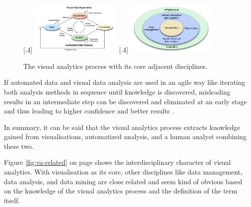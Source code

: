 \begin{figure}[!htb]
    \centering
  [.4\linewidth]
    {
        \includegraphics[width=0.4\textwidth,keepaspectratio]
        {images/va/va-process.png}
    }
    \qquad
    [.4\linewidth]
    {
        \includegraphics[width=0.4\textwidth,keepaspectratio]
        {images/va/va-related.png}
    }

    \caption{The visual analytics process with its core adjacent disciplines.}
\end{figure}

If automated data and visual data analysis are used in an agile way like iterating both analysis methods in sequence until knowledge is discovered, misleading results in an intermediate step can be discovered and eliminated at an early stage and thus leading to higher confidence and better results .

In summary, it can be said that the visual analytics process extracts knowledge gained from visualisations, automatized analysis, and a human analyst combining these two.

Figure \ref{fig:va-related} on page \pageref{fig:va-related} shows the interdisciplinary character of visual analytics. With visualisation as its core, other disciplines like data management, data analysis, and data mining are close related and seem kind of obvious based on the knowledge of the visual analytics process and the definition of the term itself.
